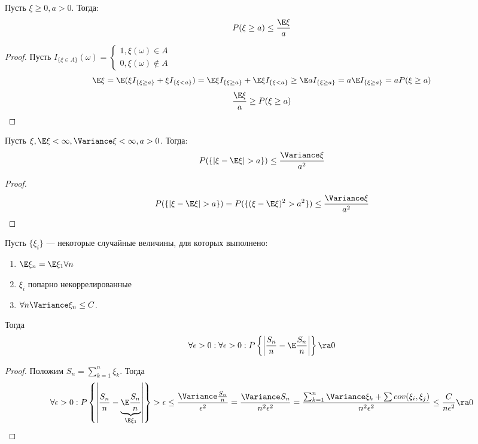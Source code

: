 
\begin{proposition}
    Пусть \(\xi \ge 0, a > 0\). Тогда:
    \[P(\xi \ge a) \le \frac{\E \xi}{a}\]
\end{proposition}
\begin{proof}
    Пусть \(I_{\{\xi \in A\}}(\omega) = \left\{\begin{array}{l}
        1, \xi(\omega) \in A \\
        0, \xi(\omega) \notin A
    \end{array}\right.\)
    \[\E\xi = \E(\xi I_{\{\xi \ge a\}} + \xi I_{\{\xi < a\}}) = \E\xi I_{\{\xi \ge a\}} + \E\xi I_{\{\xi < a\}}\ge \E aI_{\{\xi \ge a\}} = a \E I_{\{\xi \ge a\}} = aP(\xi \ge a)\]
    \[\frac{\E \xi}{a} \ge P(\xi \ge a)\]
\end{proof}

\begin{proposition}
    Пусть \(\xi, \E \xi < \infty, \Variance \xi < \infty, a > 0\). Тогда:
    \[P(\{|\xi - \E\xi| > a\}) \le \frac{\Variance \xi}{a^2}\]
\end{proposition}
\begin{proof}
    \[P(\{|\xi - \E\xi| > a\}) = P(\{(\xi - \E\xi)^2 > a^2\}) \le \frac{\Variance \xi}{a^2}\]
\end{proof}

\begin{theorem}
    Пусть \(\{\xi_i\}\) --- некоторые случайные величины, для которых выполнено:
    \begin{enumerate}
        \item \(\E \xi_n = \E \xi_1 \forall n\)
        \item \(\xi_i\) попарно некоррелированные
        \item \(\forall n \Variance \xi_n \le C\).
    \end{enumerate}
    Тогда
    \[\forall \epsilon > 0: \forall \epsilon > 0: P\left\{\left|\frac{S_n}{n} - \E\frac{S_n}{n}\right|\right\} \ra 0\]
\end{theorem}
\begin{proof}
    Положим \(S_n = \sum_{k = 1}^n \xi_k\). Тогда 
    \[\forall \epsilon > 0: P\left\{\left|\frac{S_n}{n} - \underbrace{\E\frac{S_n}{n}}_{\E\xi_1}\right|\right\} > \epsilon \le \frac{\Variance \frac{S_n}{n}}{\epsilon^2} = \frac{\Variance S_n}{n^2\epsilon^2} = \frac{\sum_{k = 1}^n \Variance \xi_k + \sum cov(\xi_i, \xi_j)}{n^2\epsilon^2} \le \frac{C}{n\epsilon^2} \ra 0\]
\end{proof}

